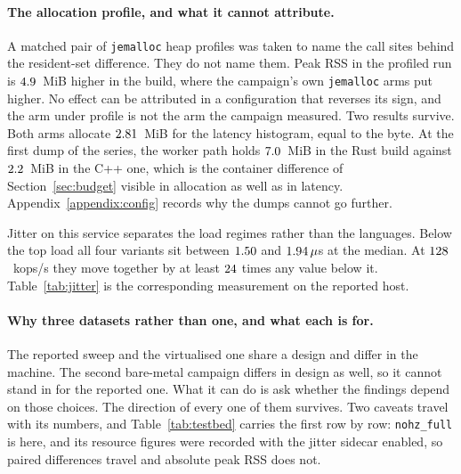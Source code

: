 \documentclass[english,oneside,a4paper,censored,csm,software-track-2020]{HYthesisML}
\begin{document}
\begin{appendices}
\paragraph{The allocation profile, and what it cannot attribute.}
A matched pair of \texttt{jemalloc} heap profiles was taken to name the call sites behind the
resident-set difference. They do not name them. Peak RSS in the profiled run is
$4.9$~MiB higher in the \BmProfRssHigher{} build, where the campaign's own
\texttt{jemalloc} arms put \BmProfCampaignHigher{} higher. No effect can be attributed in a
configuration that reverses its sign, and the arm under profile is not the arm the campaign
measured. Two results survive. Both arms allocate $2.81$~MiB for the latency
histogram, equal to the byte. At the first dump of the series, the worker path holds
$7.0$~MiB in the Rust build against $2.2$~MiB in the C++ one, which
is the container difference of Section~\ref{sec:budget} visible in allocation as well as in
latency. Appendix~\ref{appendix:config} records why the dumps cannot go further.

Jitter on this service separates the load regimes rather than the languages. Below the top load
all four variants sit between $1.50$ and $1.94\,\mu$s at the median.
At $128$~kops/s they move together by at least $24$ times any value
below it. Table~\ref{tab:jitter} is the corresponding measurement on the reported host.

\paragraph{Why three datasets rather than one, and what each is for.}
The reported sweep and the virtualised one share a design and differ in the machine. The second
bare-metal campaign differs in design as well, so it cannot stand in for the reported one. What
it can do is ask whether the findings depend on those choices. The direction of every one of them
survives. Two caveats travel with its numbers, and Table~\ref{tab:testbed} carries the first
row by row: \texttt{nohz\_full} is \BmNohzFull{} here, and its resource figures were recorded with
the jitter sidecar enabled, so paired differences travel and absolute peak RSS does not.





\end{appendices}
\end{document}
